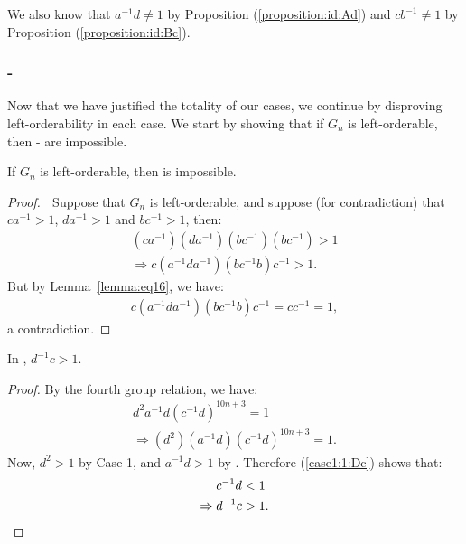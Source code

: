 We also know that $a^{-1}d\neq{}1$ by Proposition (\ref{proposition:id:Ad}) and $cb^{-1}\neq{}1$ by Proposition (\ref{proposition:id:Bc}).

\subsubsection{-}
\noindent{}Now that we have justified the totality of our cases, we continue by disproving left-orderability in each case. We start by showing that if $G_n$ is left-orderable, then - are impossible.

\begin{proposition} If $G_n$ is left-orderable, then  is impossible.
\end{proposition}
\begin{proof} $\;$ Suppose that $G_n$ is left-orderable, and suppose (for contradiction) that $ca^{-1}>1$, $da^{-1}>1$ and $bc^{-1}>1$, then: 
\begin{align*}
(ca^{-1})(da^{-1})(bc^{-1})(bc^{-1})>1\\
\Rightarrow{}c(a^{-1}da^{-1})(bc^{-1}b)c^{-1}>1.
\end{align*}
But by Lemma~\ref{lemma:eq16}, we have:
\begin{align*}
c(a^{-1}da^{-1})(bc^{-1}b)c^{-1}=cc^{-1}=1,
\end{align*}
a contradiction.
\end{proof}

\begin{lemma} In , $d^{-1}c>1$.\label{case1.1:Dc}
\end{lemma}
\begin{proof} By the fourth group relation, we have:
\begin{align}
d^{2}a^{-1}d(c^{-1}d)^{10n+3}=1\nonumber{}\\
\Rightarrow{}(d^{2})(a^{-1}d)(c^{-1}d)^{10n+3}=1.\label{case1:1:Dc}
\end{align}
Now, $d^{2}>1$ by Case 1, and $a^{-1}d>1$ by . Therefore (\ref{case1:1:Dc}) shows that:
\begin{align*}
c^{-1}d&<1\\
\Rightarrow{}d^{-1}c&>1.\qedhere
\end{align*}
\end{proof}

